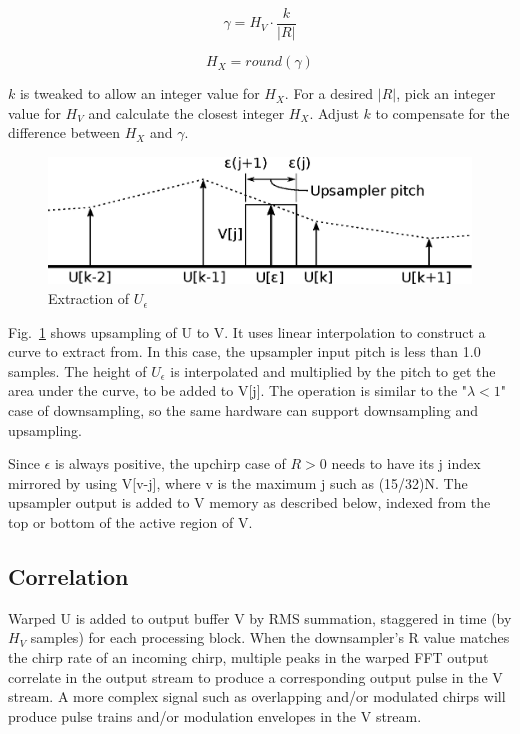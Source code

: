 \begin{equation}  \label{eq:hv}
\gamma = H_V \cdot \frac{k}{|R|}
\end{equation}

\begin{equation}
H_X = round(\gamma)
\end{equation}

$k$ is tweaked to allow an integer value for $H_X$.
For a desired $|R|$, pick an integer value for $H_V$ and
calculate the closest integer $H_X$.
Adjust $k$ to compensate for the difference between $H_X$ and $\gamma$.

\begin{figure}
	\centering
	\includegraphics[width=0.95\linewidth]{../source/uint_e}
	\caption[U interpolation]{Extraction of $U_\epsilon$}
	\label{fig:uint}
\end{figure}

Fig.~\ref{fig:uint} shows upsampling of U to V. It uses linear interpolation to
construct a curve to extract from.
In this case, the upsampler input pitch is less than 1.0 samples.
The height of $U_\epsilon$ is interpolated and multiplied by the pitch to get
the area under the curve, to be added to V[j].
The operation is similar to the "$\lambda < 1$" case of downsampling,
so the same hardware can support downsampling and upsampling.

Since $\epsilon$ is always positive, the upchirp case of $R>0$ needs to have its
j index mirrored by using V[v-j], where v is the maximum j such as (15/32)N.
The upsampler output is added to V memory as described below, indexed from the
top or bottom of the active region of V.

\subsection{Correlation}

Warped U is added to output buffer V by RMS summation,
staggered in time (by $H_V$ samples) for each processing block.
When the downsampler's R value matches the chirp rate of an incoming chirp,
multiple peaks in the warped FFT output correlate in the output stream to
produce a corresponding output pulse in the V stream.
A more complex signal such as overlapping and/or modulated chirps will produce
pulse trains and/or modulation envelopes in the V stream.

